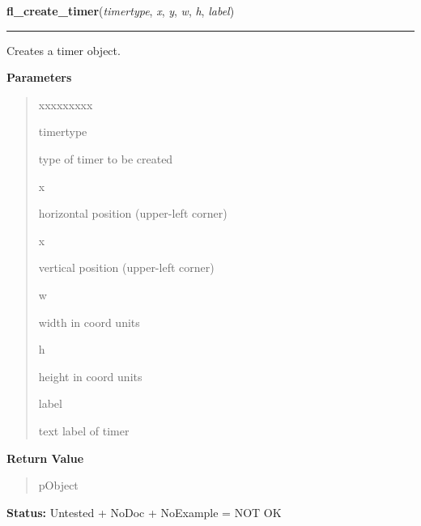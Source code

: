     \label{xformslib:library:fl_create_timer}

    \vspace{0.5ex}

\hspace{.8\funcindent}\begin{boxedminipage}{\funcwidth}

    \raggedright \textbf{fl\_create\_timer}(\textit{timertype}, \textit{x}, \textit{y}, \textit{w}, \textit{h}, \textit{label})

    \vspace{-1.5ex}

    \rule{\textwidth}{0.5\fboxrule}
\setlength{\parskip}{2ex}
    Creates a timer object.

\setlength{\parskip}{1ex}
      \textbf{Parameters}
      \vspace{-1ex}

      \begin{quote}
        \begin{Ventry}{xxxxxxxxx}

          \item[timertype]

          type of timer to be created

          \item[x]

          horizontal position (upper-left corner)

          \item[x]

          vertical position (upper-left corner)

          \item[w]

          width in coord units

          \item[h]

          height in coord units

          \item[label]

          text label of timer

        \end{Ventry}

      \end{quote}

      \textbf{Return Value}
    \vspace{-1ex}

      \begin{quote}
      pObject

      \end{quote}

\textbf{Status:} Untested + NoDoc + NoExample = NOT OK



    \end{boxedminipage}


